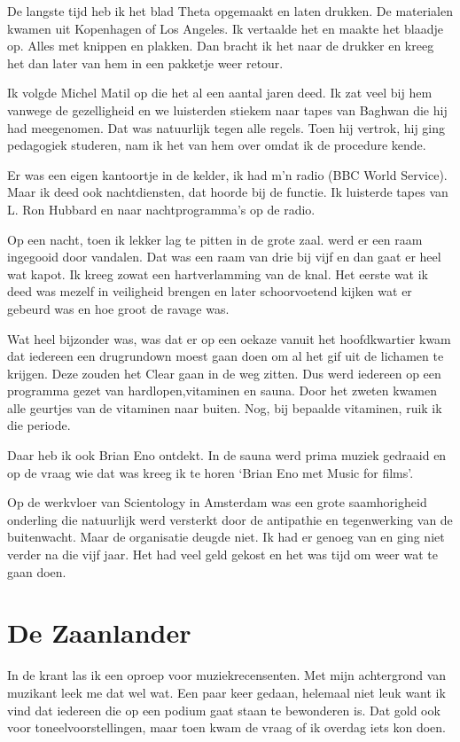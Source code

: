 \documentclass[10pt,twoside,openright]{memoir}
\begin{document}
De langste tijd heb ik het blad Theta opgemaakt en laten drukken. De materialen kwamen uit Kopenhagen of Los Angeles. Ik vertaalde het en maakte het blaadje op. Alles met knippen en plakken. Dan bracht ik het naar de drukker en kreeg het dan later van hem in een pakketje weer retour. 

Ik volgde Michel Matil op die het al een aantal jaren deed. Ik zat veel bij hem vanwege de gezelligheid en we luisterden stiekem naar tapes van Baghwan die hij had meegenomen. Dat was natuurlijk tegen alle regels. Toen hij vertrok, hij ging pedagogiek studeren, nam ik het van hem over omdat ik de procedure kende. 

Er was een eigen kantoortje in de kelder, ik had m’n radio (BBC World Service). Maar ik deed ook nachtdiensten, dat hoorde bij de functie. Ik luisterde tapes van L. Ron Hubbard en naar nachtprogramma’s op de radio. 

Op een nacht, toen ik lekker lag te pitten in de grote zaal. werd er een raam ingegooid door vandalen. Dat was een raam van drie bij vijf en dan gaat er heel wat kapot. Ik kreeg zowat een hartverlamming van de knal. Het eerste wat ik deed was mezelf in veiligheid brengen en later schoorvoetend kijken wat er gebeurd was en hoe groot de ravage was.

Wat heel bijzonder was, was dat er op een oekaze vanuit het hoofdkwartier kwam dat iedereen een drugrundown moest gaan doen om al het gif uit de lichamen te krijgen. Deze zouden het Clear gaan in de weg zitten. Dus werd iedereen op een programma gezet van hardlopen,vitaminen en sauna. Door het zweten kwamen alle geurtjes van de vitaminen naar buiten. Nog, bij bepaalde vitaminen, ruik ik die periode. 

Daar heb ik ook Brian Eno ontdekt. In de sauna werd prima muziek gedraaid en op de vraag wie dat was kreeg ik te horen ‘Brian Eno met Music for films’.

Op de werkvloer van Scientology in Amsterdam was een grote saamhorigheid onderling die natuurlijk werd versterkt door de antipathie en tegenwerking van de buitenwacht. Maar de organisatie deugde niet. Ik had er genoeg van en ging niet verder na die vijf jaar. Het had veel geld gekost en het was tijd om weer wat te gaan doen.

\chapter{De Zaanlander} %
\label{cha:zaanlander}

In de krant las ik een oproep voor muziekrecensenten. Met mijn achtergrond van muzikant leek me dat wel wat. Een paar keer gedaan, helemaal niet leuk want ik vind dat iedereen die op een podium gaat staan te bewonderen is. Dat gold ook voor toneelvoorstellingen, maar toen kwam de vraag of ik overdag iets kon doen. 
\end{document}
